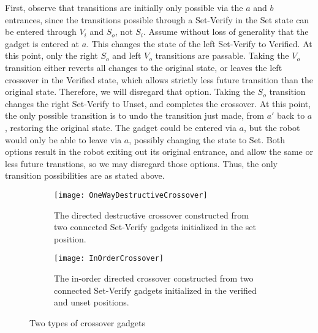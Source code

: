 First, observe that transitions are initially only possible via the $a$ and $b$ entrances, since the transitions possible through a Set-Verify in the Set state can be entered through $V_i$ and $S_o$, not $S_i$. Assume without loss of generality that the gadget is entered at $a$. This changes the state of the left Set-Verify to Verified. At this point, only the right $S_o$ and left $V_o$ transitions are passable. Taking the $V_o$ transition either reverts all changes to the original state, or leaves the left crossover in the Verified state, which allows strictly less future transition than the original state. Therefore, we will disregard that option. Taking the $S_o$ transition changes the right Set-Verify to Unset, and completes the crossover. At this point, the only possible transition is to undo the transition just made, from $a'$ back to $a$, restoring the original state. The gadget could be entered via $a$, but the robot would only be able to leave via $a$, possibly changing the state to Set. Both options result in the robot exiting out its original entrance, and allow the same or less future transtions, so we may disregard those options. Thus, the only transition possibilities are as stated above.

\begin{figure}[!ht]
  \centering
  \begin{subfigure}[b]{0.47\textwidth}
    \texttt{[image: OneWayDestructiveCrossover]}
    \caption{The directed destructive crossover constructed from two connected Set-Verify gadgets initialized in the set position.}
    \label{fig:DestructiveCrossover}
  \end{subfigure}
  \hfill
  \begin{subfigure}[b]{0.47\textwidth}
    \texttt{[image: InOrderCrossover]}
    \caption{The in-order directed crossover constructed from two connected Set-Verify gadgets initialized in the verified and unset positions.}
    \label{fig:InOrderCrossover}
  \end{subfigure}
  \caption{Two types of crossover gadgets}
\end{figure}





